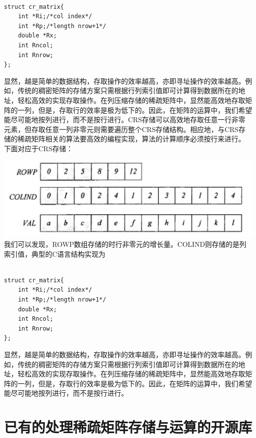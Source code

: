 \begin{lstlisting}

struct cr_matrix{ 
	int *Ri;/*col index*/ 
	int *Rp;/*length nrow+1*/ 
	double *Rx; 
	int Rncol;
	int Rnrow;
};

\end{lstlisting}

显然，越是简单的数据结构，存取操作的效率越高，亦即寻址操作的效率越高。例如，传统的稠密矩阵的存储方案只需根据行列索引值即可计算得到数据所在的地址，轻松高效的实现存取操作。在列压缩存储的稀疏矩阵中，显然能高效地存取矩阵的一列，但是，存取行的效率是极为低下的。因此，在矩阵的运算中，我们希望能尽可能地按列进行，而不是按行进行。CRS存储可以高效地存取任意一行非零元素，但存取任意一列非零元则需要遍历整个CRS存储结构。相应地，与CRS存储的稀疏矩阵相关的算法要高效的编程实现，算法的计算顺序必须按行来进行。\cite{fengguangxiang2010.}
下面对应于CRS存储：
\newline\newline\newline

\includegraphics[scale=0.25]{crs.png}
\newline\newline
我们可以发现，ROWP数组存储的时行非零元的增长量。COLIND则存储的是列索引值，典型的C语言结构实现为\newline

\begin{lstlisting}

struct cr_matrix{ 
	int *Ri;/*col index*/ 
	int *Rp;/*length nrow+1*/ 
	double *Rx; 
	int Rncol;
	int Rnrow;
};

\end{lstlisting}

显然，越是简单的数据结构，存取操作的效率越高，亦即寻址操作的效率越高。例如，传统的稠密矩阵的存储方案只需根据行列索引值即可计算得到数据所在的地址，轻松高效的实现存取操作。在列压缩存储的稀疏矩阵中，显然能高效地存取矩阵的一列，但是，存取行的效率是极为低下的。因此，在矩阵的运算中，我们希望能尽可能地按列进行，而不是按行进行。

\section{已有的处理稀疏矩阵存储与运算的开源库}

